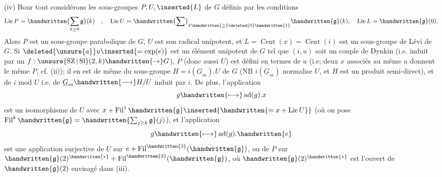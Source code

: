 (iv) Bour tout  considérons les sous-groupes $P,U,\inserted{L}$ de $G$ définis par les conditions
\[
\operatorname{Lie}P=\handwritten{\sum_{k\geq0}\mathfrak{g}}(k)\quad,\quad
\operatorname{Lie}U=\handwritten{\sum}_{k\handwritten{\geq}\deleted{0}\handwritten{1}}\handwritten{\mathfrak{g}}(k),\quad
\operatorname{Lie}L=\handwritten{\mathfrak{g}}(0).
\]
Alors $P$ est un sous-groupe parabolique de $G$, $U$ est son radical unipotent, et $L=\operatorname{Cent}(x)=\operatorname{Cent}(i)$  est un sous-groupe de Lévi de $G$. Si $\deleted{\unsure{a}}u\inserted{=\exp(e)}$ est un élément unipotent de $G$ tel que $(i,u)$ soit un couple de Dynkin (i.e. induit par un $f:\unsure{\operatorname{SZ}|\operatorname{Sl}}(2,k)\handwritten{\to}G$), $P$ (donc aussi $U$) est défini en termes de $u$ (i.e; deux $x$ associés au même $u$ donnent le même $P$, cf. (ii)); il en est de même du sous-groupe $H=i(\underline{G}_m).U$ de $G$ (NB $i(\underline{G}_m)$ normalise $U$, et $H$ est un produit semi-direct), et de $i$ mod $U$ i.e. de $\underline{G}_m\handwritten{\longrightarrow}H/U$ induit par $i$. De plus, l'application
\[
g\handwritten{\longmapsto}\operatorname{ad}(g).x
\]
est un isomorphisme de $U$ avec $x+\operatorname{Fil}^{1}\handwritten{\mathfrak{g}}\inserted{\handwritten{=x+\operatorname{Lie}U}}$ (où on pose $\operatorname{Fil}^{k}\handwritten{\mathfrak{g}}=\handwritten{\sum_{j\geq k}\mathfrak{g}}(j)$), et l'application
\[
g\handwritten{\longmapsto}\operatorname{ad}(g).\handwritten{e}
\]
est une application surjective de $U$ sur $e+\operatorname{Fil}^{\handwritten{3}}(\handwritten{\mathfrak{g}})$, ou de $P$ sur $\handwritten{\mathfrak{g}}(2)^{\handwritten{*}}+\operatorname{Fil}^{\handwritten{3}}(\handwritten{\mathfrak{g}})$, où $\handwritten{\mathfrak{g}}(2)^{\handwritten{*}}$ est l'ouvert de $\handwritten{\mathfrak{g}}(2)$ envisagé dans (iii).


